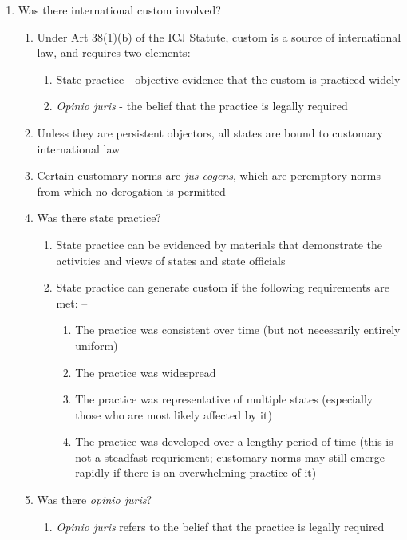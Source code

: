 \begin{enumerate}
\begin{enumerate}
    \end{enumerate}
    \item Was there international custom involved?
    \begin{enumerate}
        \item Under Art 38(1)(b) of the ICJ Statute, custom is a source of international law, and requires two elements:
        \begin{enumerate}
            \item State practice - objective evidence that the custom is practiced widely
            \item \textit{Opinio juris} - the belief that the practice is legally required
        \end{enumerate}
        \item Unless they are persistent objectors, all states are bound to customary international law
        \item Certain customary norms are \textit{jus cogens}, which are peremptory norms from which no derogation is permitted
        \item Was there state practice?
        \begin{enumerate}
            \item State practice can be evidenced by materials that demonstrate the activities and views of states and state officials
            \item State practice can generate custom if the following requirements are met: -- 
            \begin{enumerate}
                \item The practice was consistent over time (but not necessarily entirely uniform)
                \item The practice was widespread
                \item The practice was representative of multiple states (especially those who are most likely affected by it)
                \item The practice was developed over a lengthy period of time (this is not a steadfast requriement; customary norms may still emerge rapidly if there is an overwhelming practice of it)
            \end{enumerate}
        \end{enumerate}
        \item Was there \textit{opinio juris}?
        \begin{enumerate}
            \item \textit{Opinio juris} refers to the belief that the practice is legally required

\end{enumerate}
\end{enumerate}
\end{enumerate}
